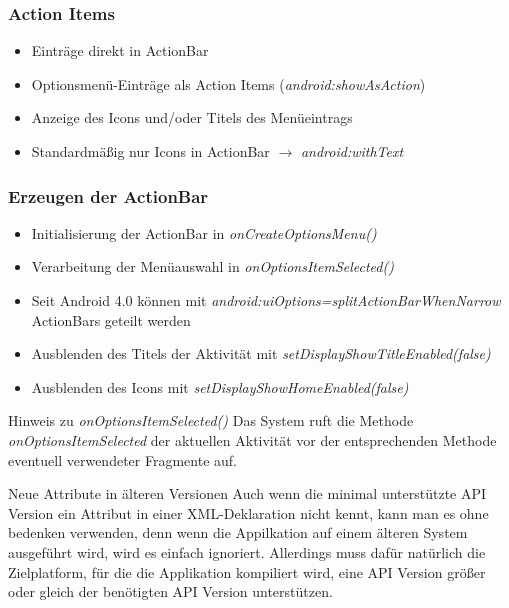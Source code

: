 \begin{frame}
   \frametitle{Action Items}
   \begin{itemize}
      \item Einträge direkt in ActionBar
      \item Optionsmenü-Einträge als Action Items (\emph{android:showAsAction})
      \item Anzeige des Icons und/oder Titels des Menüeintrags
      \item Standardmäßig nur Icons in ActionBar $\rightarrow$ \emph{android:withText}
   \end{itemize}

   
\end{frame}

\begin{frame}
   \frametitle{Erzeugen der ActionBar}
   \begin{itemize}
      \item Initialisierung der ActionBar in \emph{onCreateOptionsMenu()}
      \item Verarbeitung der Menüauswahl in \emph{onOptionsItemSelected()}
      \item Seit Android 4.0 können mit \emph{android:uiOptions=splitActionBarWhenNarrow} 
      	ActionBars geteilt werden
      \item Ausblenden des Titels der Aktivität mit \emph{setDisplayShowTitleEnabled(false)}
      \item Ausblenden des Icons mit \emph{setDisplayShowHomeEnabled(false)}
   \end{itemize}

   \begin{alertblock}{Hinweis zu \emph{onOptionsItemSelected()}}
      Das System ruft die Methode \emph{onOptionsItemSelected} der aktuellen Aktivität 
      vor der entsprechenden Methode eventuell verwendeter Fragmente auf.
   \end{alertblock}

   \begin{alertblock}{Neue Attribute in älteren Versionen}
      Auch wenn die minimal unterstützte API Version ein Attribut in einer 
      XML-Deklaration nicht kennt, kann man es ohne bedenken verwenden, denn 
      wenn die Appilkation auf einem älteren System ausgeführt wird, wird es einfach ignoriert. 
      Allerdings muss dafür natürlich die Zielplatform, für die die Applikation 
      kompiliert wird, eine API Version größer oder gleich der benötigten API Version unterstützen.
   \end{alertblock}
\end{frame}

